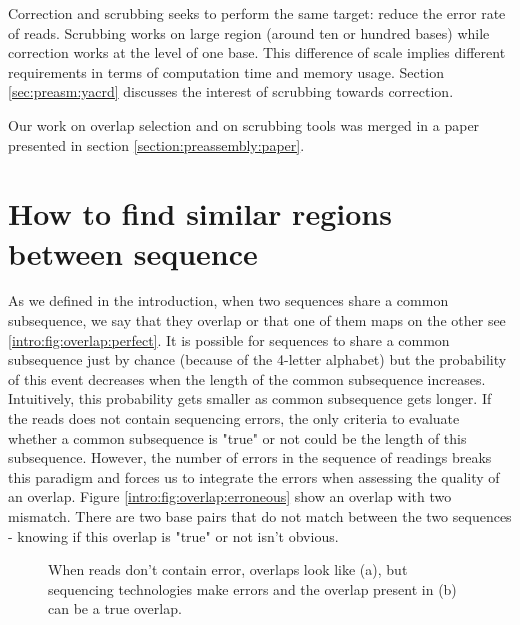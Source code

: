 \documentclass[main.tex]{subfiles}
\begin{document}
Correction and scrubbing seeks to perform the same target: reduce the error rate of reads. Scrubbing works on large region (around ten or hundred bases) while correction works at the level of one base. This difference of scale implies different requirements in terms of computation time and memory usage.  Section \ref{sec:preasm:yacrd} discusses the interest of scrubbing towards correction.

Our work on overlap selection and on scrubbing tools was merged in a paper presented in section \ref{section:preassembly:paper}.

\section{How to find similar regions between sequence} \label{sec:preasm:ovl}

As we defined in the introduction, when two sequences share a common subsequence, we say that they overlap or that one of them maps on the other see \ref{intro:fig:overlap:perfect}. It is possible for sequences to share a common subsequence just by chance (because of the 4-letter alphabet) but the probability of this event decreases when the length of the common subsequence increases. Intuitively, this probability gets smaller as common subsequence gets longer. If the reads does not contain sequencing errors, the only criteria to evaluate whether a common subsequence is "true" or not could be the length of this subsequence. However, the number of errors in the sequence of readings breaks this paradigm and forces us to integrate the errors when assessing the quality of an overlap. Figure \ref{intro:fig:overlap:erroneous} show an overlap with two mismatch. There are two base pairs that do not match between the two sequences - knowing if this overlap is "true" or not isn't obvious.


\begin{figure}[ht]
    \centering
    \caption{When reads don't contain error, overlaps look like (a), but sequencing technologies make errors and the overlap present in (b) can be a true overlap.}
    \label{intro:fig:overlap}
\end{figure}
\end{document}
